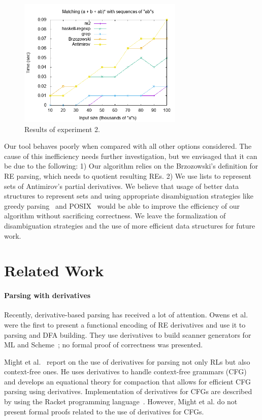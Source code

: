 \documentclass[review]{elsarticle}
\theoremstyle{definition}
\begin{document}
\begin{figure}[!ht]
    \includegraphics[width=0.7\textwidth]{abs.png}
   \centering
   \caption{Results of experiment 2.}
   \label{fig:graph2}
\end{figure}

Our tool behaves poorly when compared with all other options
considered. The cause of this inefficiency needs further
investigation, but we envisaged that it can be due to the
following: 1) Our algorithm relies on the Brzozowski's definition for RE
parsing, which needs to quotient resulting REs. 2) We use lists to
represent sets of Antimirov's partial derivatives. We believe that
usage of better data structures to represent sets and using
appropriate disambiguation strategies like greedy
parsing~\cite{FrischC04} and POSIX~\cite{SulzmannL14} would be able to
improve the efficiency of our algorithm without sacrificing
correctness. We leave the formalization of disambiguation strategies
and the use of more efficient data structures for future work.

\section{Related Work}\label{sec:related}

\paragraph{Parsing with derivatives} Recently, derivative-based
parsing has received a lot of attention. Owens et al. were the first
to present a functional encoding of RE derivatives and use it to
parsing and DFA building. They use derivatives to build scanner
generators for ML and Scheme~\cite{Owens2009}; no formal proof of
correctness was presented.

Might et al.~\cite{Might2011} report on
the use of derivatives for parsing not only RLs but also context-free
ones. He uses derivatives to handle context-free grammars (CFG) and
develops an equational theory for compaction that allows for efficient
CFG parsing using derivatives. Implementation of derivatives for CFGs
are described by using the Racket programming
language~\cite{Felleisen2013}. However, Might et al. do not present
formal proofs related to the use of derivatives for CFGs.
\end{document}
